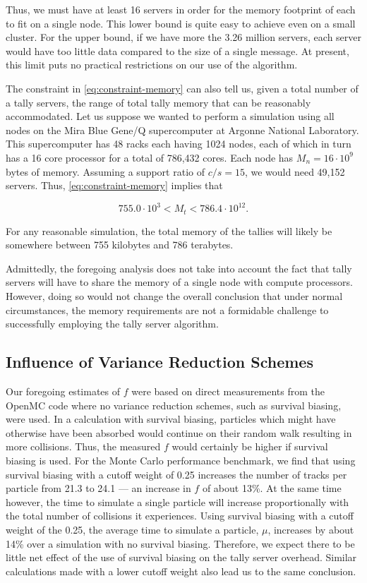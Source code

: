 \documentclass[3p,fleqn]{elsarticle}
\begin{document}
\noindent Thus, we must have at least 16 servers in order for the memory
footprint of each to fit on a single node. This lower bound is quite easy to
achieve even on a small cluster. For the upper bound, if we have more the 3.26
million servers, each server would have too little data compared to the size of
a single message. At present, this limit puts no practical restrictions on our
use of the algorithm.

The constraint in \eqref{eq:constraint-memory} can also tell us, given a total
number of a tally servers, the range of total tally memory that can be
reasonably accommodated. Let us suppose we wanted to perform a simulation using
all nodes on the Mira Blue Gene/Q supercomputer at Argonne National
Laboratory. This supercomputer has 48 racks each having 1024 nodes, each of
which in turn has a 16 core processor for a total of 786,432 cores. Each node
has $M_n = 16 \cdot 10^9$ bytes of memory. Assuming a support ratio of $c/s =
15$, we would need 49,152 servers. Thus, \eqref{eq:constraint-memory} implies
that

\begin{equation}
  \label{eq:constraint-mira}
  755.0 \cdot 10^3 < M_t < 786.4 \cdot 10^{12}.
\end{equation}

\noindent For any reasonable simulation, the total memory of the tallies will
likely be somewhere between 755 kilobytes and 786 terabytes.

Admittedly, the foregoing analysis does not take into account the fact that
tally servers will have to share the memory of a single node with compute
processors. However, doing so would not change the overall conclusion that under
normal circumstances, the memory requirements are not a formidable challenge to
successfully employing the tally server algorithm.

\subsection{Influence of Variance Reduction Schemes}

Our foregoing estimates of $f$ were based on direct measurements from the OpenMC
code where no variance reduction schemes, such as survival biasing, were
used. In a calculation with survival biasing, particles which might have
otherwise have been absorbed would continue on their random walk resulting in
more collisions. Thus, the measured $f$ would certainly be higher if survival
biasing is used. For the Monte Carlo performance benchmark, we find that using
survival biasing with a cutoff weight of 0.25 increases the number of tracks per
particle from 21.3 to 24.1 --- an increase in $f$ of about 13\%. At the same
time however, the time to simulate a single particle will increase
proportionally with the total number of collisions it experiences. Using
survival biasing with a cutoff weight of the 0.25, the average time to simulate
a particle, $\mu$, increases by about 14\% over a simulation with no survival
biasing. Therefore, we expect there to be little net effect of the use of
survival biasing on the tally server overhead. Similar calculations made with a
lower cutoff weight also lead us to the same conclusion.
\end{document}
